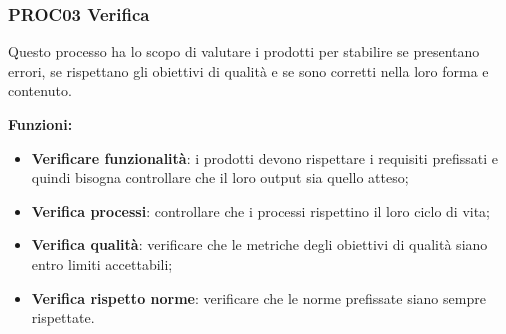 \documentclass[../piano_di_qualifica.tex]{subfiles}
\begin{document}
%
%

\subsubsection{PROC03 Verifica}
Questo processo ha lo scopo di valutare i prodotti per stabilire se presentano errori, se rispettano gli obiettivi di qualità e se sono corretti nella loro forma e contenuto.

\textbf{Funzioni:}
\smallbreak
\begin{itemize}
	\item \textbf{Verificare funzionalità}:  i prodotti devono rispettare i requisiti prefissati e quindi bisogna controllare che il loro output sia quello atteso;
	\item \textbf{Verifica processi}:  controllare che i processi rispettino il loro ciclo di vita;
	\item \textbf{Verifica qualità}:  verificare che le metriche degli obiettivi di qualità siano entro limiti accettabili;
	\item \textbf{Verifica rispetto norme}: verificare che le norme prefissate siano sempre rispettate.
\end{itemize}
\end{document}

